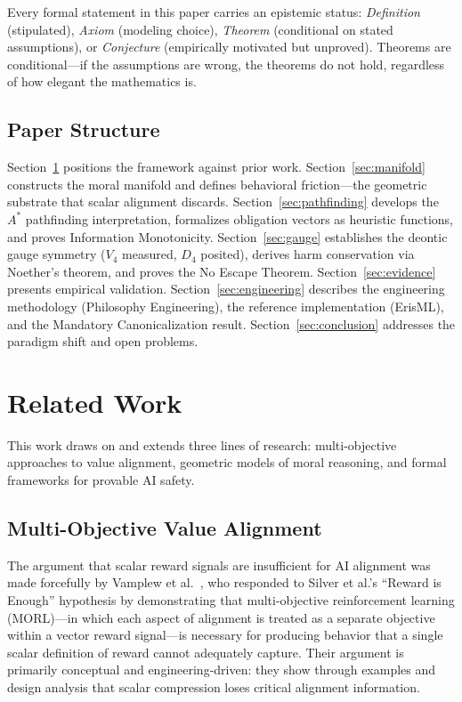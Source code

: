 \documentclass[12pt,letterpaper]{article}
\theoremstyle{definition}
\theoremstyle{remark}
\begin{document}
Every formal statement in this paper carries an epistemic status: \emph{Definition} (stipulated), \emph{Axiom} (modeling choice), \emph{Theorem} (conditional on stated assumptions), or \emph{Conjecture} (empirically motivated but unproved). Theorems are conditional---if the assumptions are wrong, the theorems do not hold, regardless of how elegant the mathematics is.

\subsection{Paper Structure}

Section~\ref{sec:related} positions the framework against prior work. Section~\ref{sec:manifold} constructs the moral manifold and defines behavioral friction---the geometric substrate that scalar alignment discards. Section~\ref{sec:pathfinding} develops the $A^*$ pathfinding interpretation, formalizes obligation vectors as heuristic functions, and proves Information Monotonicity. Section~\ref{sec:gauge} establishes the deontic gauge symmetry ($V_4$ measured, $D_4$ posited), derives harm conservation via Noether's theorem, and proves the No Escape Theorem. Section~\ref{sec:evidence} presents empirical validation. Section~\ref{sec:engineering} describes the engineering methodology (Philosophy Engineering), the reference implementation (ErisML), and the Mandatory Canonicalization result. Section~\ref{sec:conclusion} addresses the paradigm shift and open problems.


\section{Related Work}
\label{sec:related}

This work draws on and extends three lines of research: multi-objective approaches to value alignment, geometric models of moral reasoning, and formal frameworks for provable AI safety.

\subsection{Multi-Objective Value Alignment}

The argument that scalar reward signals are insufficient for AI alignment was made forcefully by Vamplew et al.\ \cite{vamplew2022}, who responded to Silver et al.'s ``Reward is Enough'' hypothesis by demonstrating that multi-objective reinforcement learning (MORL)---in which each aspect of alignment is treated as a separate objective within a vector reward signal---is necessary for producing behavior that a single scalar definition of reward cannot adequately capture. Their argument is primarily conceptual and engineering-driven: they show through examples and design analysis that scalar compression loses critical alignment information.
\end{document}
